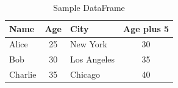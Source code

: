 \begin{table}[htbp]
    \centering
    \caption{Sample DataFrame}
    \label{tab:tab:sample_df}
    \begin{tabular}{lclc}
        \toprule
        {Name} & {Age} & {City} & {Age plus 5} \\
        \midrule
        Alice   & 25 & New York    & 30 \\
        Bob     & 30 & Los Angeles & 35 \\
        Charlie & 35 & Chicago     & 40 \\
        \bottomrule
    \end{tabular}
\end{table}